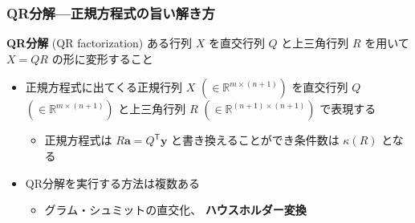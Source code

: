 \documentclass[dvipdfmx,aspectratio=169,20pt]{beamer}
\newcommand{\myfontsetting}[3]{{\fontsize{#1}{#2}\selectfont #3}}
\begin{document}
\begin{frame}
\frametitle{\myfontsetting{24pt}{24pt}{QR分解---正規方程式の旨い解き方}}
\begin{block}{\myfontsetting{20pt}{22pt}{\bf QR分解} {\small (QR factorization)}}
\myfontsetting{17pt}{17pt}{
ある行列 $X$ を直交行列 $Q$ と上三角行列 $R$ を用いて $X=QR$ の形に変形すること
}
\end{block}
\vspace{-2mm}
\begin{itemize}
    \item \myfontsetting{14pt}{16pt}{ 
    正規方程式に出てくる正規行列 $X$ \myfontsetting{10pt}{10pt}{ 
    $(\in \mathbb{R}^{m\times (n+1)})$
    } を直交行列 $Q$ \myfontsetting{10pt}{10pt}{ 
    $(\in \mathbb{R}^{m\times (n+1)})$
    } と上三角行列 $R$ \myfontsetting{10pt}{10pt}{ 
    $(\in \mathbb{R}^{(n+1)\times (n+1)})$
    } で表現する
    }
     \begin{itemize}
         \item \myfontsetting{10pt}{12pt}{ 
    正規方程式は $R\bm{a} = Q^\mathsf{T}\bm{y}$ と書き換えることができ条件数は $\kappa(R)$ となる
        }
     \end{itemize}
     \item \myfontsetting{14pt}{16pt}{ 
     QR分解を実行する方法は複数ある
     }
     \begin{itemize}
         \item \myfontsetting{12pt}{14pt}{ グラム・シュミットの直交化、 {\bf ハウスホルダー変換}
         }
     \end{itemize}
\end{itemize}
\end{frame}
\end{document}
